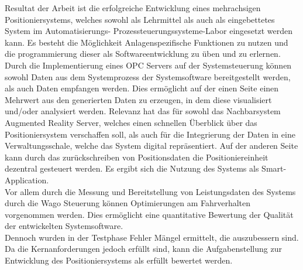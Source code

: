 \documentclass[../../Bachelorarbeit.tex]{subfiles}
\begin{document}
\smallskip \newline
Resultat der Arbeit ist die erfolgreiche Entwicklung eines mehrachsigen Positioniersystems, welches sowohl als Lehrmittel als auch als eingebettetes System im Automatisierungs- \bzw Prozessteuerungssysteme-Labor eingesetzt werden kann. Es besteht die Möglichkeit Anlagenspezifische Funktionen zu nutzen und die programmierung dieser als Softwareentwicklung zu üben und zu erlernen. Durch die Implementierung eines OPC Servers auf der Systemsteuerung können sowohl Daten aus dem Systemprozess \bzw der Systemsoftware bereitgestellt werden, als auch Daten empfangen werden. Dies ermöglicht auf der einen Seite einen Mehrwert aus den generierten Daten zu erzeugen, in dem diese visualisiert und/oder analysiert werden. Relevanz hat das für sowohl das Nachbarsystem Augmented Reality Server, welches einen schnellen Überblick über das Positioniersystem verschaffen soll, als auch für die Integrierung der Daten in eine Verwaltungsschale, welche das System digital repräsentiert. Auf der anderen Seite kann durch das zurückschreiben von \zB Positionsdaten die Positioniereinheit dezentral gesteuert werden. Es ergibt sich die Nutzung des Systems als Smart-Application. \\
Vor allem durch die Messung und Bereitstellung von Leistungsdaten des Systems durch die Wago Steuerung können Optimierungen am Fahrverhalten vorgenommen werden. Dies ermöglicht eine quantitative Bewertung der Qualität der entwickelten Systemsoftware.\\
Dennoch wurden in der Testphase Fehler \bzw Mängel ermittelt, die auszubessern sind. Da die Kernanforderungen jedoch erfüllt sind, kann die Aufgabenstellung zur Entwicklung des Positioniersystems als erfüllt bewertet werden. 
\end{document}
